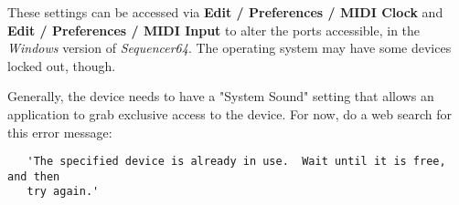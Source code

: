   These settings can be accessed via
   \textbf{Edit / Preferences / MIDI Clock} and
   \textbf{Edit / Preferences / MIDI Input} to
	alter the ports accessible, in the \textsl{Windows}
   version of \textsl{Sequencer64}.
   The operating system may have some devices locked out, though.

   Generally, the device needs to have a "System Sound" setting that allows an
   application to grab exclusive access to the device.
   For now, do a web search for this error message:

\begin{verbatim}
   'The specified device is already in use.  Wait until it is free, and then
   try again.'
\end{verbatim}

